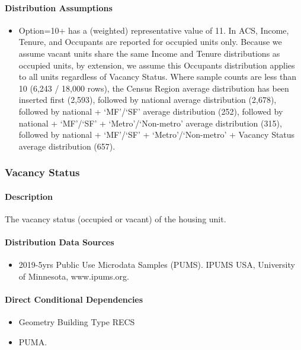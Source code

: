 \paragraph{Distribution Assumptions}
\begin{itemize}
\item
  Option=10+ has a (weighted) representative value of 11. In ACS,
  Income, Tenure, and Occupants are reported for occupied units only.
  Because we assume vacant units share the same Income and Tenure
  distributions as occupied units, by extension, we assume this
  Occupants distribution applies to all units regardless of Vacancy
  Status. Where sample counts are less than 10 (6,243 / 18,000 rows), the
  Census Region average distribution has been inserted first (2,593),
  followed by national average distribution (2,678), followed by national
  +
 `MF'/`SF'
  average distribution (252), followed by national +
  `MF'/`SF'
  +
  `Metro'/`Non-metro'
  average distribution (315), followed by national +
  `MF'/`SF'
  +
  `Metro'/`Non-metro'
  + Vacancy Status average distribution (657).
\end{itemize}

\subsubsection{Vacancy Status}\label{vacancy_status}
\paragraph{Description}
The vacancy status (occupied or vacant) of the housing unit.

\paragraph{Distribution Data Sources}
\begin{itemize}
\item
  2019-5yrs Public Use Microdata Samples (PUMS). IPUMS USA, University
  of Minnesota, www.ipums.org.
\end{itemize}

\paragraph{Direct Conditional Dependencies}
\begin{itemize}
    \item Geometry Building Type RECS
    \item PUMA.
\end{itemize}

